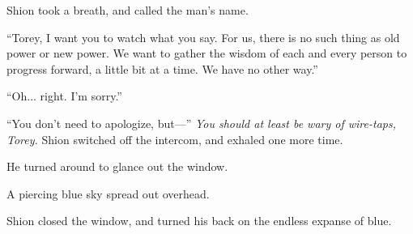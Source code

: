 Shion took a breath, and called the man's name.

``Torey, I want you to watch what you say. For us, there is no such
thing as old power or new power. We want to gather the wisdom of each
and every person to progress forward, a little bit at a time. We have no
other way.''

``Oh... right. I'm sorry.''

``You don't need to apologize, but---'' \emph{You should at least be wary of
wire-taps, Torey.} Shion switched off the intercom, and exhaled one more
time.

He turned around to glance out the window.

A piercing blue sky spread out overhead.

Shion closed the window, and turned his back on the endless expanse of
blue.